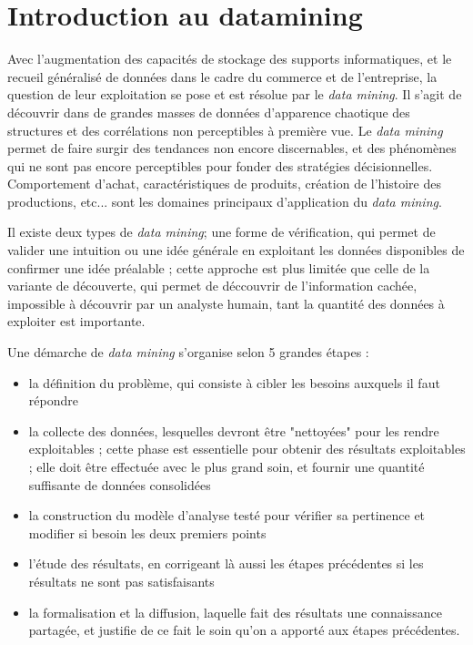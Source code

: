 \section{Introduction au datamining}
Avec l'augmentation des capacités de stockage des supports informatiques, et le recueil généralisé de données dans le cadre du commerce et de l'entreprise, la question de leur exploitation se pose et est résolue par le \textit{data mining}.
Il s'agit de découvrir dans de grandes masses de données d'apparence chaotique des structures et des corrélations non perceptibles à première vue. Le \textit{data mining} permet de faire surgir des tendances non encore discernables, et des phénomènes qui ne sont pas encore perceptibles pour fonder des stratégies décisionnelles. Comportement d'achat, caractéristiques de produits, création de l'histoire des productions, etc... sont les domaines principaux d'application du \textit{data mining}.

Il existe deux types de \textit{data mining}; une forme de vérification, qui permet de valider une intuition ou une idée générale en exploitant les données disponibles de confirmer une idée préalable ; cette approche est plus limitée que celle de la variante de découverte, qui permet de déccouvrir de l'information cachée, impossible à découvrir par un analyste humain, tant la quantité des données à exploiter est importante. 

Une démarche de \textit{data mining} s'organise selon 5 grandes étapes : 
\begin{itemize}
\item la définition du problème, qui consiste à cibler les besoins auxquels il faut répondre
\item la collecte des données, lesquelles devront être "nettoyées" pour les rendre exploitables ; cette phase est essentielle pour obtenir des résultats exploitables ; elle doit être effectuée avec le plus grand soin, et fournir une quantité suffisante de données consolidées
\item la construction du modèle d'analyse testé pour vérifier sa pertinence et modifier si besoin les deux premiers points
\item l'étude des résultats, en corrigeant là aussi les étapes précédentes si les résultats ne sont pas satisfaisants
\item la formalisation et la diffusion, laquelle fait des résultats une connaissance partagée, et justifie de ce fait le soin qu'on a apporté aux étapes précédentes. 

\end{itemize}

